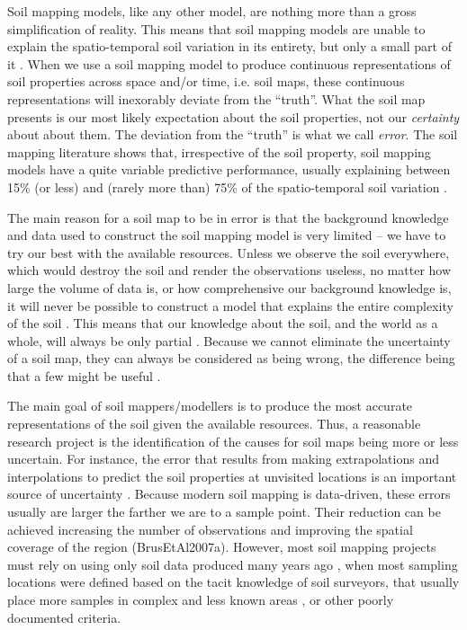 Soil mapping models, like any other model, are nothing more than a gross simplification of reality.
This means that soil mapping models are unable to explain the spatio-temporal soil variation in 
its entirety, but only a small part of it \citep{Heuvelink1998a}. When we use a soil mapping model
to produce continuous representations of soil properties across space and/or time, i.e. soil
maps, these continuous representations will inexorably deviate from the ``truth''. What the soil map
presents is our most likely expectation about the soil properties, not our \textit{certainty} about 
about them. The deviation from the ``truth'' is what we call \textit{error}. The soil mapping 
literature shows that, irrespective of the soil property, soil mapping models have a quite variable 
predictive performance, usually explaining between 15\% (or less) and (rarely more than) 75\% of 
the spatio-temporal soil variation \citep{MooreEtAl1993, OdehEtAl1994, GesslerEtAl1995, 
McKenzieEtAl1999, GobinEtAl2001, SumflethEtAl2008, SunEtAl2012, ViscarraRosselEtAl2013, 
NussbaumEtAl2014, HenglEtAl2015, GaschEtAl2015, HeungEtAl2016}.

The main reason for a soil map to be in error is that the background knowledge and data used to 
construct the soil mapping model is very limited -- we have to try our best with the available 
resources. Unless we observe the soil everywhere, which would destroy the soil and render the 
observations useless, no matter how large the volume of data is, or how comprehensive our background
knowledge is, it will never be possible to construct a model that explains the entire complexity of 
the soil \citep{Tukey1997}. This means that our knowledge about the soil, and the world as a whole, 
will always be only partial \citep{Box1993}. Because we cannot eliminate the uncertainty of a soil 
map, they can always be considered as being wrong, the difference being that a few might be useful 
\citep{Box1976}.

The main goal of soil mappers/modellers is to produce the most accurate representations of the soil 
given the available resources. Thus, a reasonable research project is the identification of the 
causes for soil maps being more or less uncertain. For instance, the error that results from making 
extrapolations and interpolations to predict the soil properties at unvisited locations is an 
important source of uncertainty \citep{HeuvelinkEtAl1999, RefsgaardEtAl2006}. Because modern soil 
mapping is data-driven, these errors usually are larger the farther we are to a sample point. Their
reduction can be achieved increasing the number of observations and improving the spatial coverage 
of the region (BrusEtAl2007a). However, most soil mapping projects must rely on using only soil 
data produced many years ago \citep{KempenEtAl2009, HenglEtAl2014, PoggioEtAl2014, NussbaumEtAl2014,
MulderEtAl2016}, when most sampling locations were defined based on the tacit knowledge of soil 
surveyors, that usually place more samples in complex and less known areas \citep{Rossiter2000}, or 
other poorly documented criteria. 

